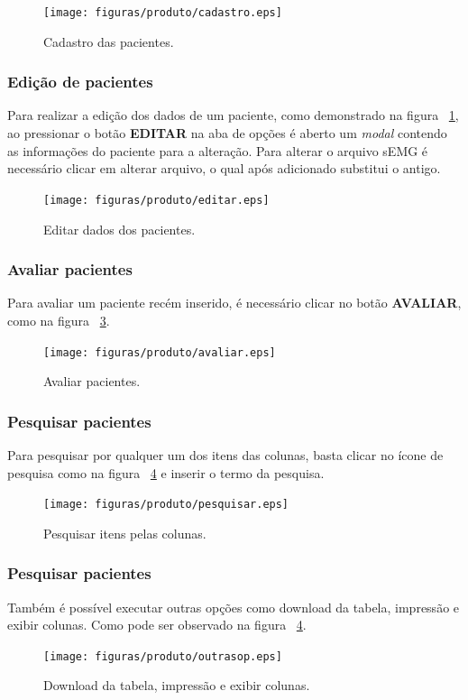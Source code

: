 \begin{figure}[!htb]
    \centering
    \texttt{[image: figuras/produto/cadastro.eps]}
    \caption{Cadastro das pacientes.}
    \label{figcadastro}
\end{figure}

\subsubsection{Edição de pacientes}
Para realizar a edição dos dados de um paciente, como demonstrado na figura ~\ref{figcadastro}, ao pressionar o botão \textbf{EDITAR} na aba de opções é aberto um \textit{modal} contendo as informações do paciente para a alteração. Para alterar o arquivo sEMG é necessário clicar em alterar arquivo, o qual após adicionado substitui o antigo.

\begin{figure}[!htb]
    \centering
    \texttt{[image: figuras/produto/editar.eps]}
    \caption{Editar dados dos pacientes.}
    \label{figeditar}
\end{figure}

\subsubsection{Avaliar pacientes}
Para avaliar um paciente recém inserido, é necessário clicar no botão \textbf{AVALIAR}, como na figura ~\ref{figavaliar}.
\begin{figure}[!htb]
    \centering
    \texttt{[image: figuras/produto/avaliar.eps]}
    \caption{Avaliar pacientes.}
    \label{figavaliar}
\end{figure}

\subsubsection{Pesquisar pacientes}
Para pesquisar por qualquer um dos itens das colunas, basta clicar no ícone de pesquisa como na figura ~\ref{figpesquisar} e inserir o termo da pesquisa.
\begin{figure}[!htb]
    \centering
    \texttt{[image: figuras/produto/pesquisar.eps]}
    \caption{Pesquisar itens pelas colunas.}
    \label{figpesquisar}
\end{figure}

\subsubsection{Pesquisar pacientes}
Também é possível executar outras opções como download da tabela, impressão e exibir colunas. Como pode ser observado na figura ~\ref{figpesquisar}.
\begin{figure}[!htb]
    \centering
    \texttt{[image: figuras/produto/outrasop.eps]}
    \caption{Download da tabela, impressão e exibir colunas.}
    \label{figoutrasop}
\end{figure}

